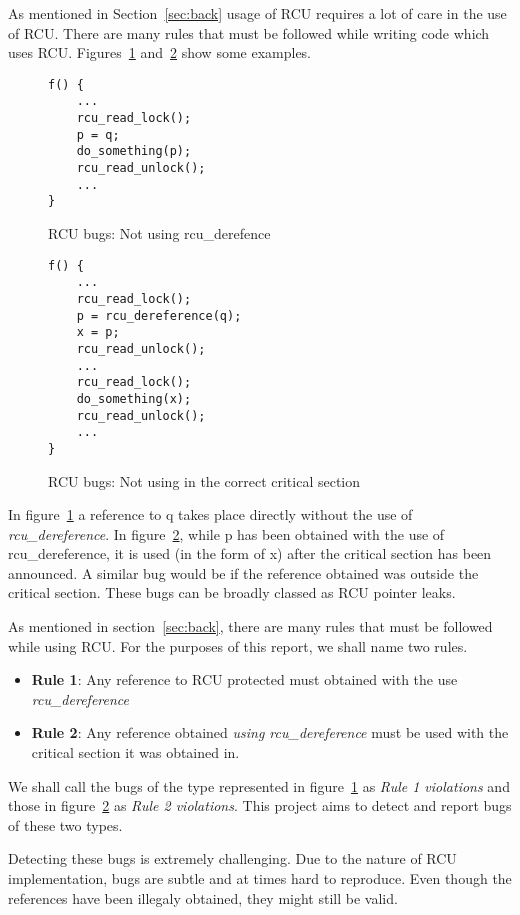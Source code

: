 As mentioned in Section~\ref{sec:back} usage of RCU requires a lot of care in
the use of RCU. There are many rules that must be followed while writing code
which uses RCU. Figures~\ref{fig:rcuderefbug} and~\ref{fig:rcuusebug} show
some examples.

\begin{figure}[h]
\centering
\begin{lstlisting}
f() {
	...
	rcu_read_lock();
	p = q;
	do_something(p);
	rcu_read_unlock();
	...
}
\end{lstlisting}
\caption{RCU bugs: Not using rcu\_derefence}\label{fig:rcuderefbug}
\end{figure}

\begin{figure}[h]
\centering
\begin{lstlisting}
f() {
	...
	rcu_read_lock();
	p = rcu_dereference(q);
	x = p;
	rcu_read_unlock();
	...
	rcu_read_lock();
	do_something(x);
	rcu_read_unlock();
	...
}
\end{lstlisting}
\caption{RCU bugs: Not using in the correct critical section}\label{fig:rcuusebug}
\end{figure}

In figure~\ref{fig:rcuderefbug} a reference to q takes place directly without the use
of \emph{rcu\_dereference}. In figure~\ref{fig:rcuusebug}, while p has been obtained with the
use of rcu\_dereference, it is used (in the form of x) after the critical section
has been announced. A similar bug would be if the reference obtained was outside the
critical section. These bugs can be broadly classed as RCU pointer leaks.

As mentioned in section~\ref{sec:back}, there are many rules that must be followed
while using RCU. For the purposes of this report, we shall name two rules.
\begin{itemize}
\item{\bf Rule 1}: Any reference to RCU protected must obtained with the use \emph{rcu\_dereference}
\item{\bf Rule 2}: Any reference obtained \emph{using rcu\_dereference} must be used with the critical section it was obtained in.
\end{itemize}

We shall call the bugs of the type represented in figure~\ref{fig:rcuderefbug} as \emph{Rule 1 violations}
and those in figure~\ref{fig:rcuusebug} as \emph{Rule 2 violations}.
This project aims to detect and report bugs of these two types.

Detecting these bugs is extremely challenging. Due to the nature of RCU implementation,
bugs are subtle and at times hard to reproduce. Even though the references have been
illegaly obtained, they might still be valid.

